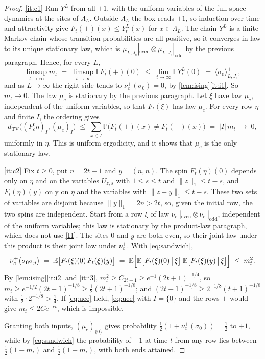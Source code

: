 \documentclass[11pt]{article}
\theoremstyle{plain}
\theoremstyle{definition}
\theoremstyle{remark}
\newcommand{\E}{\mathbb{E}}
\newcommand{\Prob}{\mathbb{P}}
\newcommand{\dtv}{d_{\mathrm{TV}}}
\newcommand{\Lam}{\Lambda}
\begin{document}
\begin{proof}
\ref{it:c1} Run $Y^L$ from all $+1$, with the uniform variables of the full-space dynamics at the sites of $\Lam_L$. Outside $\Lam_L$ the box reads $+1$, so induction over time and attractivity give $F_t(\mathbf+)(x)\le Y^L_t(x)$ for $x\in\Lam_L$. The chain $Y^L$ is a finite Markov chain whose transition probabilities are all positive, so it converges in law to its unique stationary law, which is $\mu^+_{L,J_c}|_{\mathrm{even}}\otimes\mu^+_{L,J_c}|_{\mathrm{odd}}$ by the previous paragraph. Hence, for every $L$,
\[
\limsup_{t\to\infty}m_t\;=\;\limsup_{t\to\infty}\E F_t(\mathbf+)(0)\;\le\;\lim_{t\to\infty}\E Y^L_t(0)\;=\;\langle\sigma_0\rangle^+_{L,J_c},
\]
and as $L\to\infty$ the right side tends to $\nu^+_c(\sigma_0)=0$, by \cref{lem:ising}\ref{it:i1}. So $m_t\to0$. The law $\mu_c$ is stationary by the previous paragraph. Let $\xi$ have law $\mu_c$, independent of the uniform variables, so that $F_t(\xi)$ has law $\mu_c$. For every row $\eta$ and finite $I$, the ordering gives
\[
\dtv\bigl((P_c^t\eta)_I,(\mu_c)_I\bigr)\;\le\;\sum_{x\in I}\Prob\bigl(F_t(\mathbf+)(x)\neq F_t(\mathbf-)(x)\bigr)\;=\;|I|\,m_t\;\longrightarrow\;0,
\]
uniformly in $\eta$. This is uniform ergodicity, and it shows that $\mu_c$ is the only stationary law.

\ref{it:c2} Fix $t\ge0$, put $n=2t+1$ and $y=(n,n)$. The spin $F_t(\eta)(0)$ depends only on $\eta$ and on the variables $U_{z,s}$ with $1\le s\le t$ and $\|z\|_1\le t-s$, and $F_t(\eta)(y)$ only on $\eta$ and the variables with $\|z-y\|_1\le t-s$. These two sets of variables are disjoint because $\|y\|_1=2n>2t$, so, given the initial row, the two spins are independent. Start from a row $\xi$ of law $\nu^+_c|_{\mathrm{even}}\otimes\nu^+_c|_{\mathrm{odd}}$, independent of the uniform variables; this law is stationary by the product-law paragraph, which does not use \ref{I1}. The sites $0$ and $y$ are both even, so their joint law under this product is their joint law under $\nu^+_c$. With \eqref{eq:sandwich},
\[
\nu^+_c\bigl(\sigma_0\sigma_y\bigr)\;=\;\E\bigl[F_t(\xi)(0)\,F_t(\xi)(y)\bigr]\;=\;\E\Bigl[\E\bigl[F_t(\xi)(0)\,\big|\,\xi\bigr]\;\E\bigl[F_t(\xi)(y)\,\big|\,\xi\bigr]\Bigr]\;\le\;m_t^2.
\]
By \cref{lem:ising}\ref{it:i2} and \ref{it:i3}, $m_t^2\ge C_{2t+1}\ge e^{-1}(2t+1)^{-1/4}$, so $m_t\ge e^{-1/2}(2t+1)^{-1/8}\ge\frac12(2t+1)^{-1/8}$; and $(2t+1)^{-1/8}\ge2^{-1/8}(t+1)^{-1/8}$ with $\frac12\cdot2^{-1/8}>\frac14$. If \eqref{eq:uee} held, \eqref{eq:uee} with $I=\{0\}$ and the rows $\mathbf\pm$ would give $m_t\le2Ce^{-ct}$, which is impossible.

Granting both inputs, $(\mu_c)_{\{0\}}$ gives probability $\frac12(1+\nu^+_c(\sigma_0))=\frac12$ to $+1$, while by \eqref{eq:sandwich} the probability of $+1$ at time $t$ from any row lies between $\frac12(1-m_t)$ and $\frac12(1+m_t)$, with both ends attained.
\end{proof}
\end{document}
